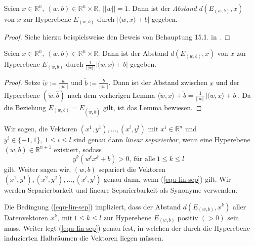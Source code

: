 \begin{lemma}
	\label{lemma-abstand-norm}
	Seien $x \in \mathbb{R}^n, \ (w,b) \in \mathbb{R}^n \times \mathbb{R},\ ||w|| = 1$.
	Dann ist der \emph{Abstand} $d(E_{(w,b)},x)$ von $x$ zur Hyperebene $E_{(w,b)}$ durch $| \langle w,x \rangle +b |$ gegeben.
\end{lemma}
\begin{proof}
	Siehe hierzu beispielsweise den Beweis von Behauptung 15.1. in \cite{sb-umlfta}.
\end{proof}

\begin{lemma}
	\label{lemma-abst-hyp-allg}
	Seien $x \in \mathbb{R}^n, \ (w,b) \in \mathbb{R}^n \times \mathbb{R}$. 
	Dann ist der Abstand $d(E_{(w,b)},x)$ von $x$ zur Hyperebene $E_{(w,b)}$ durch
	$\frac{1}{||w||}|\langle w,x \rangle + b|$
	gegeben.
\end{lemma}
\begin{proof}
	Setze $\tilde{w} := \frac{w}{||w||}$ und $\tilde{b} := \frac{b}{||w||}$. Dann ist der Abstand zwischen $x$ und der Hyperebene $(\tilde{w},\hat{b})$ nach dem vorherigen Lemma
 	$\langle \tilde{w},x \rangle + \tilde{b} = \frac{1}{||w||}|\langle w,x \rangle + b|$. 
 	Da die Beziehung $E_{(w,b)}=E_{(\tilde{w},\tilde{b})}$ gilt, ist das Lemma bewiesen. 
\end{proof}

\begin{definition}
	\label{def-lin-sep}
	Wir sagen, die Vektoren $(x^1,y^1),...,(x^l,y^l)$ mit $x^i \in \mathbb{R}^n$  und $y^i \in \{-1,1\} ,\ 1 \leq i \leq l$ sind genau dann \emph{linear separierbar}, wenn eine Hyperebene $(w,b) \in \mathbb{R}^{n+1}$ existiert, sodass 
	\begin{equation}
		\label{equ-lin-sep}
		y^k(w^tx^k+b) > 0, \ \text{für alle} \ 1 \leq k \leq l
	\end{equation}
	gilt. Weiter sagen wir, $(w,b)$ separiert die Vektoren $(x^1,y^1),(x^2,y^2),...,(x^l,y^l)$ genau dann, wenn (\ref{equ-lin-sep}) gilt. Wir werden Separierbarkeit und lineare Separierbarkeit als Synonyme verwenden. 
\end{definition}

\begin{bemerkung}
	Die Bedingung (\ref{equ-lin-sep}) impliziert, dass der Abstand $d(E_{(w,b)},x^k)$ aller Datenvektoren 
	$x^k, \ \text{mit} \ 1 \leq k \leq l$ zur Hyperebene $E_{(w,b)}$ positiv $(> 0)$ sein muss. Weiter legt  (\ref{equ-lin-sep}) genau fest, in welchen der durch die Hyperebene induzierten Halbräumen die Vektoren liegen müssen.
\end{bemerkung}

